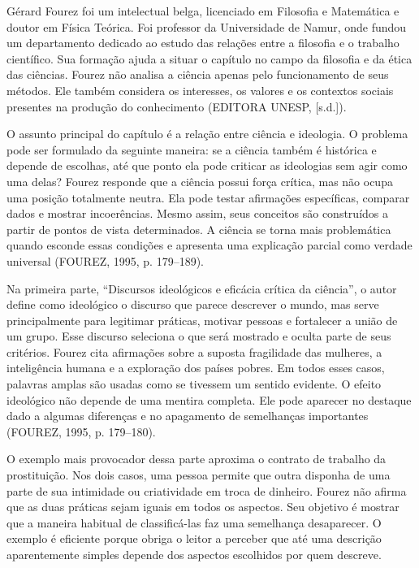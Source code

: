 \documentclass[12pt,a4paper]{article}
\begin{document}
Gérard Fourez foi um intelectual belga, licenciado em Filosofia e Matemática e doutor em Física Teórica. Foi professor da Universidade de Namur, onde fundou um departamento dedicado ao estudo das relações entre a filosofia e o trabalho científico. Sua formação ajuda a situar o capítulo no campo da filosofia e da ética das ciências. Fourez não analisa a ciência apenas pelo funcionamento de seus métodos. Ele também considera os interesses, os valores e os contextos sociais presentes na produção do conhecimento (EDITORA UNESP, [s.d.]).

O assunto principal do capítulo é a relação entre ciência e ideologia. O problema pode ser formulado da seguinte maneira: se a ciência também é histórica e depende de escolhas, até que ponto ela pode criticar as ideologias sem agir como uma delas? Fourez responde que a ciência possui força crítica, mas não ocupa uma posição totalmente neutra. Ela pode testar afirmações específicas, comparar dados e mostrar incoerências. Mesmo assim, seus conceitos são construídos a partir de pontos de vista determinados. A ciência se torna mais problemática quando esconde essas condições e apresenta uma explicação parcial como verdade universal (FOUREZ, 1995, p. 179--189).

Na primeira parte, ``Discursos ideológicos e eficácia crítica da ciência'', o autor define como ideológico o discurso que parece descrever o mundo, mas serve principalmente para legitimar práticas, motivar pessoas e fortalecer a união de um grupo. Esse discurso seleciona o que será mostrado e oculta parte de seus critérios. Fourez cita afirmações sobre a suposta fragilidade das mulheres, a inteligência humana e a exploração dos países pobres. Em todos esses casos, palavras amplas são usadas como se tivessem um sentido evidente. O efeito ideológico não depende de uma mentira completa. Ele pode aparecer no destaque dado a algumas diferenças e no apagamento de semelhanças importantes (FOUREZ, 1995, p. 179--180).

O exemplo mais provocador dessa parte aproxima o contrato de trabalho da prostituição. Nos dois casos, uma pessoa permite que outra disponha de uma parte de sua intimidade ou criatividade em troca de dinheiro. Fourez não afirma que as duas práticas sejam iguais em todos os aspectos. Seu objetivo é mostrar que a maneira habitual de classificá-las faz uma semelhança desaparecer. O exemplo é eficiente porque obriga o leitor a perceber que até uma descrição aparentemente simples depende dos aspectos escolhidos por quem descreve.
\end{document}

